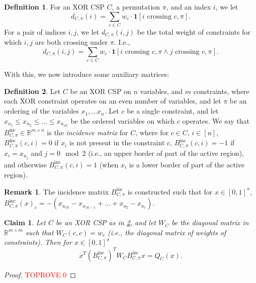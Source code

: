 \documentclass[11pt]{article}
\newtheorem{claim}[theorem]{Claim}
\theoremstyle{definition}
\newtheorem{definition}{Definition}[section]
\newtheorem{remark}[theorem]{Remark}
\newcommand{\R}{\mathbb{R}}
\begin{document}
\begin{definition}\label{def:NumberCrossing}
	For an XOR CSP $C$, a permutation $\pi$, and an index $i$, we let
    \[
	 d_{C, \pi}(i) = \sum_{c \in C} w_c \cdot \mathbf{1}[i \text{ crossing } c,\pi].
	\]
    For a pair of
    indices $i, j$, we let $d_{C, \pi}(i,j)$ be the total weight of constraints for which $i,j$ are both crossing under $\pi$. I.e.,
	\[
	 d_{C, \pi}(i,j) = \sum_{c \in C} w_c \cdot \mathbf{1}[i \text{ crossing } c,\pi \wedge j \text{ crossing } c,\pi].
	\]
\end{definition}

With this, we now introduce some auxiliary matrices:

\begin{definition}\label{def:incMatrixXOR}
	Let $C$ be an XOR CSP on $n$ variables, and $m$ constraints, where each XOR constraint operates on an even number of variables, and let $\pi$ be an ordering of the variables $x_1, \dots x_n$. Let $c$ be a single constraint, and let $x_{u_1} \leq x_{u_2} \leq \dots \leq x_{u_{|S|}}$ be the ordered variables on which $c$ operates. We say that $B^{\text{inc}}_{C, \pi} \in \R^{m \times n}$ is the \emph{incidence matrix} for $C$, where for $c \in C$, $i \in [n]$, $B^{\text{inc}}_{C, \pi}(c, i) = 0$ if $x_i$ is not present in the constraint $c$, $B^{\text{inc}}_{C, \pi}(c, i) = -1$ if $x_i = x_{u_j}$ and $j = 0 \mod 2$ (i.e., an upper border of part of the active region), and otherwise $B^{\text{inc}}_{C, \pi}(c, i) = 1$ (when $x_i$ is a lower border of part of the active region). 
\end{definition}

\begin{remark}\label{rmk:incidence}
	The incidence matrix $B^{\text{inc}}_{C, \pi}$ is constructed such that for $x \in [0,1]^{\pi}$, $B^{\text{inc}}_{C, \pi}(x)_c = -(x_{u_{|S|}} - x_{u_{|S|-1}} + \dots + x_{u_2} - x_{u_1})$.
\end{remark}

\begin{claim}\label{clm:quadraticEquivalence}
	Let $C$ be an XOR CSP as in \cref{def:incMatrixXOR}, and let $W_C$ be the diagonal matrix in $\R^{m \times m}$ such that $W_C(c, c) = w_c$ (i.e., the diagonal matrix of weights of constraints). Then for $x \in [0,1]^{\pi}$
	\[
	x^T (B^{\text{inc}}_{C, \pi})^T W_C B^{\text{inc}}_{C, \pi} x = Q_C(x).
	\]
\end{claim}

\begin{proof}\textcolor{red}{TOPROVE 0}\end{proof}
\end{document}
